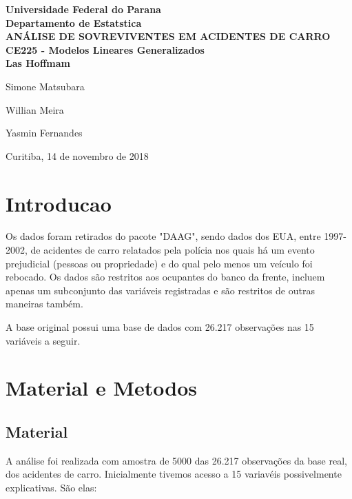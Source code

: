 \documentclass[a4paper]{article} %
\begin{document}
\begin{titlepage}

  \center{\rule{15cm}{2pt}}
  \begin{center}{\bf Universidade Federal do Parana\\
      Departamento de Estat\’{\i}stica\\[7.5cm]

      {\large
        ANÁLISE DE SOVREVIVENTES EM ACIDENTES DE CARRO}\\[3cm]

      { CE225 - Modelos Lineares Generalizados}\\[2cm]

      { La\’{\i}s Hoffmam }
      
      { Simone Matsubara }
      
      { Willian Meira }
      
      { Yasmin Fernandes }

      \vfill
      Curitiba, 14 de novembro de 2018
      \center{\rule{15cm}{2pt}}}
  \end{center}
\end{titlepage}

\tableofcontents
\pagebreak

\section{Introducao}
Os dados foram retirados do pacote "DAAG", sendo dados dos EUA, entre 1997-2002, de acidentes de carro relatados pela polícia nos quais há um evento prejudicial (pessoas ou propriedade) e do qual pelo menos um veículo foi rebocado.
Os dados são restritos aos ocupantes do banco da frente, incluem apenas um subconjunto das variáveis registradas e são restritos de outras maneiras também.


A base original possui uma base de dados com 26.217 observações nas 15 variáveis a seguir.

\section{Material e Metodos}
\subsection{Material}
A análise foi realizada com amostra de 5000 das 26.217 observações da base real, dos acidentes de carro.  Inicialmente tivemos acesso a 15 variavéis possivelmente explicativas. São elas:\\
\end{document}
